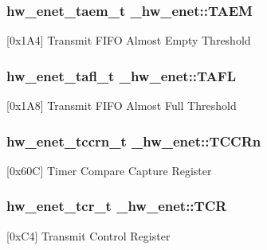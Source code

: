 \subsubsection[{\texorpdfstring{T\+A\+EM}{TAEM}}]{ {\bf hw\+\_\+enet\+\_\+taem\+\_\+t} \+\_\+hw\+\_\+enet\+::\+T\+A\+EM}\hypertarget{struct__hw__enet_afc13fdd860b7ac04bbfb44e429d6ea49}{}\label{struct__hw__enet_afc13fdd860b7ac04bbfb44e429d6ea49}
\mbox{[}0x1\+A4\mbox{]} Transmit F\+I\+FO Almost Empty Threshold 
\subsubsection[{\texorpdfstring{T\+A\+FL}{TAFL}}]{ {\bf hw\+\_\+enet\+\_\+tafl\+\_\+t} \+\_\+hw\+\_\+enet\+::\+T\+A\+FL}\hypertarget{struct__hw__enet_ae03f240204de582966236b80c322e0e9}{}\label{struct__hw__enet_ae03f240204de582966236b80c322e0e9}
\mbox{[}0x1\+A8\mbox{]} Transmit F\+I\+FO Almost Full Threshold 
\subsubsection[{\texorpdfstring{T\+C\+C\+Rn}{TCCRn}}]{ {\bf hw\+\_\+enet\+\_\+tccrn\+\_\+t} \+\_\+hw\+\_\+enet\+::\+T\+C\+C\+Rn}\hypertarget{struct__hw__enet_ac8bfb1751b711fc0ec4d1278dbd5e126}{}\label{struct__hw__enet_ac8bfb1751b711fc0ec4d1278dbd5e126}
\mbox{[}0x60C\mbox{]} Timer Compare Capture Register 
\subsubsection[{\texorpdfstring{T\+CR}{TCR}}]{ {\bf hw\+\_\+enet\+\_\+tcr\+\_\+t} \+\_\+hw\+\_\+enet\+::\+T\+CR}\hypertarget{struct__hw__enet_a2730fb8a555fc489c8c6855fa848a2f4}{}\label{struct__hw__enet_a2730fb8a555fc489c8c6855fa848a2f4}
\mbox{[}0x\+C4\mbox{]} Transmit Control Register 
